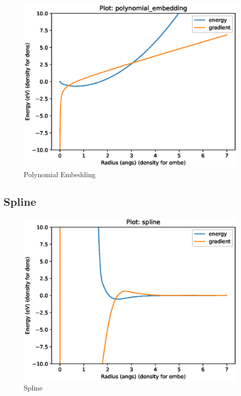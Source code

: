 \FloatBarrier
\begin{figure}[h]
  \begin{center}
    \includegraphics[width=0.7\linewidth]{appendix/functions/pots_plots/polynomial_embedding.eps}
    \caption{Polynomial Embedding}
    \label{figure:functionspolynomialembedding}
  \end{center}
\end{figure}





\FloatBarrier
\subsection{Spline}





\FloatBarrier
\begin{figure}[h]
  \begin{center}
    \includegraphics[width=0.7\linewidth]{appendix/functions/pots_plots/spline.eps}
    \caption{Spline}
    \label{figure:functionsspline}
  \end{center}
\end{figure}




